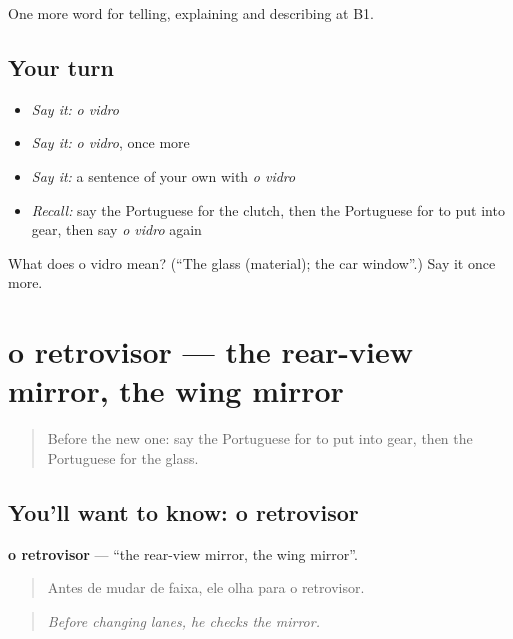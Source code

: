 \begin{grammarlens}[title={What you've built}]
One more word for telling, explaining and describing at B1.
\end{grammarlens}

\subsection*{Your turn}
\begin{itemize}
\raggedright
  \item \emph{Say it:} \emph{o vidro}
  \item \emph{Say it:} \emph{o vidro}, once more
  \item \emph{Say it:} a sentence of your own with \emph{o vidro}
  \item \emph{Recall:} say the Portuguese for the clutch, then the Portuguese for to put into gear, then say \emph{o vidro} again
\end{itemize}

\begin{tcolorbox}[breakable,colback=teal!4,colframe=teal!35!black,title={Before you move on}]
What does o vidro mean? (\textquotedblleft{}The glass (material); the car window\textquotedblright{}.) Say it once more.
\end{tcolorbox}
\section[o retrovisor]{o retrovisor — the rear-view mirror, the wing mirror}

\label{lesson:PT-C403-retrovisor}



\begin{quote}
Before the new one: say the Portuguese for to put into gear, then the Portuguese for the glass.
\end{quote}

\subsection*{You'll want to know: o retrovisor}
\textbf{o retrovisor} — \textquotedblleft{}the rear-view mirror, the wing mirror\textquotedblright{}.

\begin{quote}
Antes de mudar de faixa, ele olha para o retrovisor.
\end{quote}

\begin{quote}
\emph{Before changing lanes, he checks the mirror.}
\end{quote}


